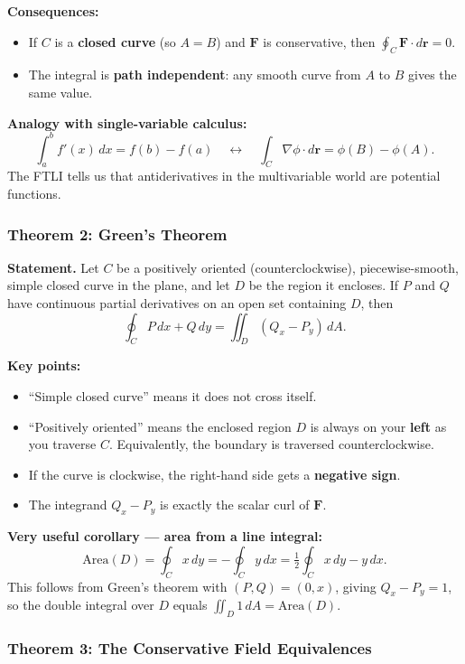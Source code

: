 \documentclass[11pt]{article}
\begin{document}
\textbf{Consequences:}
\begin{itemize}
  \item If $C$ is a \textbf{closed curve} (so $A = B$) and $\mathbf{F}$ is conservative, then $\oint_C \mathbf{F}\cdot d\mathbf{r} = 0$.
  \item The integral is \textbf{path independent}: any smooth curve from $A$ to $B$ gives the same value.
\end{itemize}

\textbf{Analogy with single-variable calculus:}
\[
  \int_a^b f'(x)\,dx = f(b) - f(a)
  \quad\longleftrightarrow\quad
  \int_C \nabla\phi\cdot d\mathbf{r} = \phi(B) - \phi(A).
\]
The FTLI tells us that antiderivatives in the multivariable world are potential functions.

\subsubsection*{Theorem 2: Green's Theorem}

\textbf{Statement.} Let $C$ be a positively oriented (counterclockwise), piecewise-smooth, simple closed curve in the plane, and let $D$ be the region it encloses. If $P$ and $Q$ have continuous partial derivatives on an open set containing $D$, then
\[
  \boxed{\oint_C P\,dx + Q\,dy = \iint_D \left(Q_x - P_y\right)\,dA.}
\]

\textbf{Key points:}
\begin{itemize}
  \item ``Simple closed curve'' means it does not cross itself.
  \item ``Positively oriented'' means the enclosed region $D$ is always on your \textbf{left} as you traverse $C$. Equivalently, the boundary is traversed counterclockwise.
  \item If the curve is clockwise, the right-hand side gets a \textbf{negative sign}.
  \item The integrand $Q_x - P_y$ is exactly the scalar curl of $\mathbf{F}$.
\end{itemize}

\textbf{Very useful corollary --- area from a line integral:}
\[
  \text{Area}(D) = \oint_C x\,dy = -\oint_C y\,dx = \tfrac{1}{2}\oint_C x\,dy - y\,dx.
\]
This follows from Green's theorem with $(P,Q) = (0,x)$, giving $Q_x - P_y = 1$, so the double integral over $D$ equals $\iint_D 1\,dA = \text{Area}(D)$.

\subsubsection*{Theorem 3: The Conservative Field Equivalences}
\end{document}
